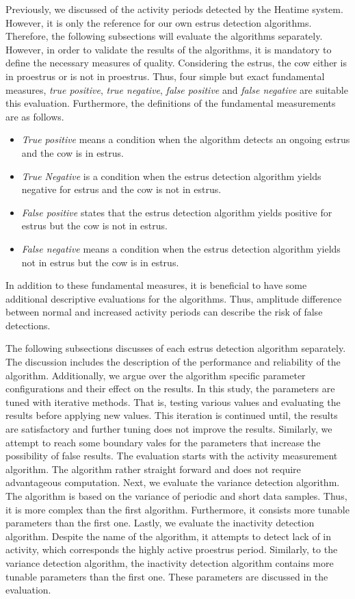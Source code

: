 \documentclass[english,12pt,a4paper,pdftex,elec,utf8]{aaltothesis}
\begin{document}
Previously, we discussed of the activity periods detected by the Heatime system. However, it is only the reference for our own estrus detection algorithms. Therefore, the following subsections will evaluate the algorithms separately. However, in order to validate the results of the algorithms, it is mandatory to define the necessary measures of quality. Considering the estrus, the cow either is in proestrus or is not in proestrus. Thus, four simple but exact fundamental measures, \textit{true positive}, \textit{true negative}, \textit{false positive} and \textit{false negative} are suitable this evaluation. Furthermore, the definitions of the fundamental measurements are as follows.

\begin{itemize}
\item \textit{True positive} means a condition when the algorithm detects an ongoing estrus and the cow is in estrus.
\item \textit{True Negative} is a condition when the estrus detection algorithm yields negative for estrus and the cow is not in estrus.
\item \textit{False positive} states that the estrus detection algorithm yields positive for estrus but the cow is not in estrus.
\item \textit{False negative} means a condition when the estrus detection algorithm yields not in estrus but the cow is in estrus.
\end{itemize}
In addition to these fundamental measures, it is beneficial to have some additional descriptive evaluations for the algorithms. Thus, amplitude difference between normal and increased activity periods can describe the risk of false detections. 


The following subsections discusses of each estrus detection algorithm separately. The discussion includes the description of the performance and reliability of the algorithm. Additionally, we argue over the algorithm specific parameter configurations and their effect on the results. In this study, the parameters are tuned with iterative methods. That is, testing various values and evaluating the results before applying new values. This iteration is continued until, the results are satisfactory and further tuning does not improve the results. Similarly, we attempt to reach some boundary vales for the parameters that increase the possibility of false results. The evaluation starts with the activity measurement algorithm. The algorithm rather straight forward and does not require advantageous computation. Next, we  evaluate the variance detection algorithm. The algorithm is based on the variance of periodic and short data samples. Thus, it is more complex than the first algorithm. Furthermore, it consists more tunable parameters than the first one. Lastly, we evaluate the inactivity detection algorithm. Despite the name of the algorithm, it attempts to detect lack of in activity, which corresponds the highly active proestrus period. Similarly, to the variance detection algorithm, the inactivity detection algorithm contains more tunable parameters than the first one. These parameters are discussed in the evaluation.
\end{document}
